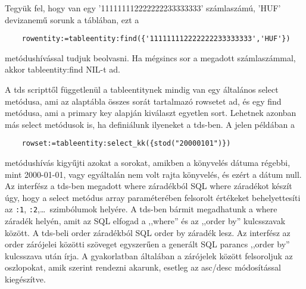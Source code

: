 Tegyük fel, hogy van egy '111111112222222233333333' 
számlaszámú, 'HUF' devizanemű sorunk a táblában, ezt a
\begin{verbatim}
    rowentity:=tableentity:find({'111111112222222233333333','HUF'})
\end{verbatim}
metódushívással tudjuk beolvasni. Ha mégsincs sor a megadott
számlaszámmal, akkor tableentity:find NIL-t ad.

A tds scripttől függetlenül a tableentitynek mindig van
egy általános select metódusa, ami az alaptábla összes
sorát tartalmazó rowsetet ad, és egy find metódusa, ami
a primary key alapján kiválaszt egyetlen sort. Lehetnek
azonban más select metódusok is, ha definiálunk ilyeneket
a tds-ben. A jelen példában a
\begin{verbatim}
    rowset:=tableentity:select_kk({stod("20000101")})
\end{verbatim}
metódushívás kigyűjti azokat a sorokat, amikben a könyvelés
dátuma régebbi, mint 2000-01-01, vagy egyáltalán nem volt rajta
könyvelés, és ezért a dátum null. Az interfész a tds-ben megadott
where záradékból SQL where záradékot készít úgy, hogy a select metódus
array paraméterében felsorolt értékeket behelyettesíti az
\verb!:1!, \verb!:2!,\ldots\  szimbólumok helyére. A tds-ben 
bármit megadhatunk a where záradék helyén, amit az SQL elfogad
a ,,where'' és az ,,order by'' kulcsszavak között.
A tds-beli order záradékból  SQL order by záradék lesz.
Az interfész az order zárójelei közötti szöveget egyszerűen a
generált SQL parancs  ,,order by'' kulcsszava után írja. 
A gyakorlatban általában a zárójelek között felsoroljuk
az oszlopokat, amik szerint rendezni akarunk, esetleg az
asc/desc módosítással kiegészítve.


